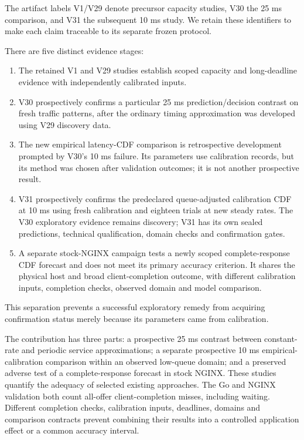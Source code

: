 \documentclass[11pt,a4paper]{article}
\begin{document}
The artifact labels V1/V29 denote precursor capacity studies, V30 the 25 ms
comparison, and V31 the subsequent 10 ms study. We retain these identifiers
to make each claim traceable to its separate frozen protocol.

There are five distinct evidence stages:

\begin{enumerate}
\item The retained V1 and V29 studies establish scoped capacity and long-deadline
evidence with independently calibrated inputs.
\item V30 prospectively confirms a particular 25 ms prediction/decision contrast
on fresh traffic patterns, after the ordinary timing approximation was
developed using V29 discovery data.
\item The new empirical latency-CDF comparison is retrospective development
prompted by V30's 10 ms failure. Its parameters use calibration records,
but its method was chosen after validation outcomes; it is not another
prospective result.
\item V31 prospectively confirms the predeclared queue-adjusted calibration CDF at 10 ms
using fresh calibration and eighteen trials at new steady rates. The V30
exploratory evidence remains discovery; V31 has its own sealed predictions,
technical qualification, domain checks and confirmation gates.
\item A separate stock-NGINX campaign tests a newly scoped complete-response CDF
forecast and does not meet its primary accuracy criterion. It shares the
physical host and broad client-completion outcome, with different calibration
inputs, completion checks, observed domain and model comparison.
\end{enumerate}
This separation prevents a successful exploratory remedy from acquiring
confirmation status merely because its parameters came from calibration.

The contribution has three parts: a prospective 25 ms contrast between
constant-rate and periodic service approximations; a separate prospective
10 ms empirical-calibration comparison within an observed low-queue domain;
and a preserved adverse test of a complete-response forecast in stock NGINX.
These studies quantify the adequacy of selected existing approaches. The
Go and NGINX validation both count all-offer client-completion misses, including
waiting. Different completion checks, calibration inputs, deadlines, domains
and comparison contracts prevent combining their results into a controlled
application effect or a common accuracy interval.
\end{document}
